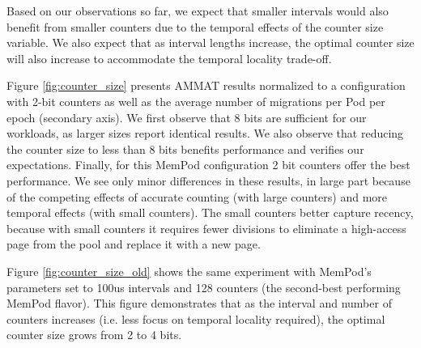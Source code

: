 Based on our observations so far, we expect that smaller intervals would also benefit from smaller counters due to the temporal effects of the counter size variable. We also expect that as interval lengths increase, the optimal counter size will also increase to accommodate the temporal locality trade-off. 

Figure \ref{fig:counter_size} presents AMMAT results normalized to a configuration with 2-bit counters as well as the average number of migrations per Pod per epoch (secondary axis). We first observe that 8 bits are sufficient for our workloads, as larger sizes report identical results. We also observe that reducing the counter size to less than 8 bits benefits performance and verifies our expectations. Finally, for this MemPod configuration 2 bit counters offer the best performance. We see only minor differences in these results,
in large part because of the competing effects of accurate counting (with
large counters) and more temporal effects (with small counters).
The small counters better capture recency, because with small counters it
requires fewer divisions  to eliminate a high-access page from the pool and
replace it with a new page.

Figure \ref{fig:counter_size_old} shows the same experiment with MemPod's parameters set to 100us intervals and 128 counters (the second-best performing MemPod flavor). This figure demonstrates that as the interval and number of counters increases (i.e. less focus on temporal locality required), the optimal counter size grows from 2 to 4 bits.

